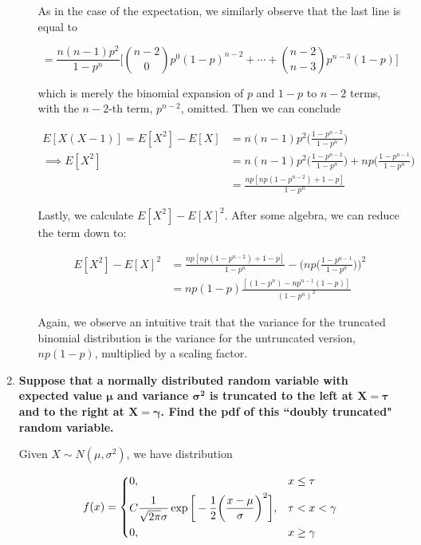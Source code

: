 \documentclass[10pt, oneside]{article}   	%
\theoremstyle{definition}
\begin{document}
\begin{enumerate}[label=9.\arabic*]
\begin{enumerate}
	As in the case of the expectation, we similarly observe that the last line is equal to
	
	\[ = \frac{n(n-1)p^2}{1-p^n} \bigg[ \binom{n-2}{0} p^0 (1-p)^{n-2} + \cdots + \binom{n-2}{n-3} p^{n-3} (1-p) \bigg] \]
	
	which is merely the binomial expansion of $p$ and $1-p$ to $n-2$ terms, with the $n-2$-th term, $p^{n-2}$, omitted. Then we can conclude
	
	\begin{align*}
	E[X(X - 1)] = E[X^2] - E[X] &= n(n-1)p^2 \bigg( \frac{1-p^{n-2}}{1-p^n} \bigg) \\
	\implies E[X^2] &= n(n-1)p^2 \bigg( \frac{1-p^{n-2}}{1-p^n} \bigg) + np \bigg( \frac{1-p^{n-1}}{1-p^n} \bigg) \\
	&= \frac{np[np(1-p^{n-2}) + 1- p]}{1-p^n}
	\end{align*}
	
	Lastly, we calculate $E[X^2] - E[X]^2$. After some algebra, we can reduce the term down to:
	
	\begin{align*}
	E[X^2] - E[X]^2 &= \frac{np[np(1-p^{n-2}) + 1- p]}{1-p^n} - \bigg( np \bigg( \frac{1-p^{n-1}}{1-p^n} \bigg) \bigg)^2 \\
	&= \boxed{ np(1-p) \frac{ [(1-p^n) - np^{n-1} (1-p)] }{(1-p^n)^2} }
	\end{align*}
	
	Again, we observe an intuitive trait that the variance for the truncated binomial distribution is the variance for the untruncated version, $np(1-p)$, multiplied by a scaling factor.
	
	\end{enumerate}

\item  \begin{tcolorbox}[
  colback=Cerulean!5!white,
  colframe=Cerulean!75!black]
\textbf{Suppose that a normally distributed random variable with expected value $\bm{\mu}$ and variance $\bm{\sigma^2}$ is truncated to the left at $\bm{X = \tau}$ and to the right at $\bm{X = \gamma}$. Find the pdf of this ``doubly truncated" random variable.}
\end{tcolorbox}

Given $X \sim N(\mu, \sigma^2)$, we have distribution

\[
f(x) = \begin{dcases}
0, & x \leq \tau \\
C \frac{1}{\sqrt{2\pi} \sigma} \exp \bigg[ -\frac{1}{2} \bigg( \frac{x-\mu}{\sigma} \bigg)^2 \bigg], & \tau < x < \gamma \\
0, & x \geq \gamma
\end{dcases}
\]


\end{enumerate}
\end{document}
